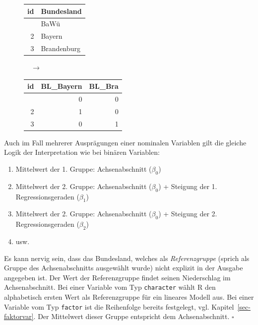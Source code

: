 \documentclass[
  letterpaper,
  oneside,
  open=any]{scrbook}
\providecommand{\tightlist}{%
  \setlength{\itemsep}{0pt}\setlength{\parskip}{0pt}}\usepackage{longtable,booktabs,array}
\theoremstyle{definition}
\theoremstyle{definition}
\theoremstyle{definition}
\theoremstyle{remark}
\begin{document}
\begin{figure}

\begin{minipage}{0.30\linewidth}

\begin{longtable}[]{@{}rl@{}}
\toprule\noalign{}
id & Bundesland \\
\midrule\noalign{}
\endhead
\bottomrule\noalign{}
\endlastfoot
1 & BaWü \\
2 & Bayern \\
3 & Brandenburg \\
\end{longtable}

\end{minipage}%
%
\begin{minipage}{0.10\linewidth}
\(\quad \rightarrow\)\end{minipage}%
%
\begin{minipage}{0.60\linewidth}

\begin{longtable}[]{@{}rrr@{}}
\toprule\noalign{}
id & BL\_Bayern & BL\_Bra \\
\midrule\noalign{}
\endhead
\bottomrule\noalign{}
\endlastfoot
1 & 0 & 0 \\
2 & 1 & 0 \\
3 & 0 & 1 \\
\end{longtable}

\end{minipage}%

\end{figure}%

Auch im Fall mehrerer Ausprägungen einer nominalen Variablen gilt die
gleiche Logik der Interpretation wie bei binären Variablen:

\begin{enumerate}
\def\labelenumi{\arabic{enumi}.}
\tightlist
\item
  Mittelwert der 1. Gruppe: Achsenabschnitt (\(\beta_0\))
\item
  Mittelwert der 2. Gruppe: Achsenabschnitt (\(\beta_0\)) + Steigung der
  1. Regressionsgeraden (\(\beta_1\))
\item
  Mittelwert der 2. Gruppe: Achsenabschnitt (\(\beta_0\)) + Steigung der
  2. Regressionsgeraden (\(\beta_2\))
\item
  usw.
\end{enumerate}

Es kann nervig sein, dass das Bundesland, welches als
\emph{Referenzgruppe} (sprich als Gruppe des Achsenabschnitts ausgewählt
wurde) nicht explizit in der Ausgabe angegeben ist. Der Wert der
Referenzgruppe findet seinen Niederschlag im Achsenabschnitt. Bei einer
Variable vom Typ \texttt{character} wählt R den alphabetisch ersten Wert
als Referenzgruppe für ein lineares Modell aus. Bei einer Variable vom
Typ \texttt{factor} ist die Reihenfolge bereits festgelegt, vgl.
Kapitel~\ref{sec-faktorvar}. Der Mittelwert dieser Gruppe entspricht dem
Achsenabschnitt. \(\square\)
\end{document}
